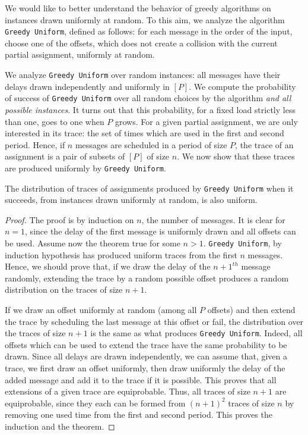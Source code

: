 \documentclass[a4paper,UKenglish,cleveref, autoref, thm-restate]{lipics-v2019}
\newcommand\greedyuniform{\texttt{Greedy Uniform}\xspace}
\begin{document}
We would like to better understand the behavior of greedy algorithms on instances drawn uniformly at random. To this aim, we analyze the algorithm \greedyuniform, defined as follows: for each message in the order of the input, choose one of the offsets, which does not create a collision with the current partial assignment, uniformly at random. 

We analyze \greedyuniform over random instances:  all messages have 
their delays drawn independently and uniformly in $[P]$. We compute the probability of success of \greedyuniform over all random choices by the algorithm \emph{and all possible instances}. 
It turns out that this probability, for a fixed load strictly less than one, goes to one when $P$ grows. 
For a given partial assignment, we are only interested in its trace: the set of times which are used in the first and second period. Hence, if $n$ messages are scheduled in a period of size $P$, the trace of an assignment is a pair of subsets of $[P]$ of size $n$. We now show that these traces are produced uniformly by \greedyuniform.

\begin{theorem}
The distribution of traces of assignments produced by \greedyuniform when it succeeds, from instances drawn uniformly at random, is also uniform.
\end{theorem}
\begin{proof}
The proof is by induction on $n$, the number of messages. It is clear for $n=1$,
since the delay of the first message is uniformly drawn and all offsets can be used.
Assume now the theorem true for some $n>1$. \greedyuniform, by induction hypothesis has produced
uniform traces from the first $n$ messages.  Hence, we should prove that, if we draw the delay
of the $n+1^{th}$ message randomly, extending the trace by a random possible offset produces a random distribution on the traces of size $n+1$. 

 If we draw an offset uniformly at random (among all $P$ offsets) and then extend the trace by scheduling the last message at this offset or fail, the distribution over the traces of size $n+1$ is the same as what produces \greedyuniform. Indeed, all offsets which can be used to extend the trace have the same probability to be drawn. Since all delays are drawn independently, we can assume that, given a trace, we first draw an offset uniformly, then draw uniformly the delay of the added message and add it to the trace if it is possible. This proves that all extensions of a given trace are equiprobable. Thus, all traces of size $n+1$ are equiprobable, since they each can be formed from $(n+1)^2$ traces of size $n$ by removing one used time from the first and second period. This proves the induction and the theorem.
\end{proof}
\end{document}
